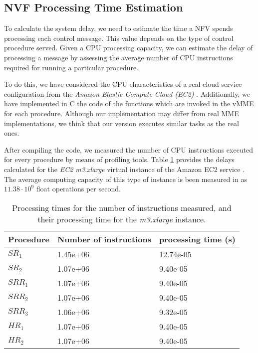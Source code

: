 \documentclass[conference]{IEEEtran}
\begin{document}
\subsection{NVF Processing Time Estimation}
\label{sec:cpu-numerical-results}


 To calculate the system delay, we need to estimate the time a NFV spends processing each control message. This value depends on the type of control procedure served. Given a CPU processing capacity, we can estimate the delay of processing a message by assessing the average number of CPU instructions required for running a particular procedure.
 
 To do this, we have considered the CPU characteristics of a real cloud service configuration from the \emph{Amazon Elastic Compute Cloud (EC2)} \cite{amazon-ec2}. Additionally, we have implemented in C the code of the functions which are invoked in the vMME for each procedure. Although our implementation may differ from real MME implementations, we think that our version executes similar tasks as the real ones. 
 
  After compiling the code, we measured the number of CPU instructions executed for every procedure by means of profiling tools. Table \ref{tab:procedure-response-time} provides the delays calculated for the \emph{EC2 m3.xlarge}  virtual instance of the Amazon EC2 service \cite{amazon-ec2}. The average computing capacity of this type of instance is been measured in \cite{iosup2011performance} as $11.38\cdot 10^9$ float operations per second.
  











\begin{table}[tb]
\centering
{\small

\begin{tabular}{l l l}
\hline
    Procedure & Number of instructions & processing time (s)\\ 
\hline
\hline
$SR_1$ & 1.45e+06 &  12.74e-05 \\ 
$SR_2$ & 1.07e+06 & 9.40e-05 \\ 
$SRR_1$ & 1.07e+06 & 9.40e-05 \\ 
$SRR_2$ & 1.07e+06 & 9.40e-05 \\ 
$SRR_3$ & 1.06e+06 & 9.32e-05 \\ 
$HR_1$ & 1.07e+06 & 9.40e-05 \\ 
$HR_2$ & 1.07e+06 & 9.40e-05 \\ 
\hline
\end{tabular}
}
\caption{Processing times for the number of instructions measured, and their processing time for the \emph{m3.xlarge} instance.}
\label{tab:procedure-response-time}
\end{table}
\end{document}
